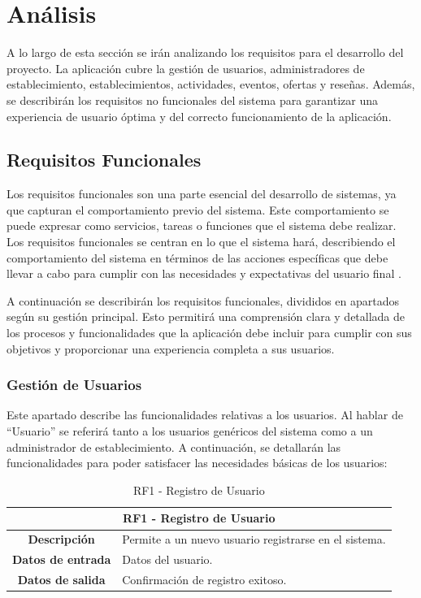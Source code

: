 \chapter{Análisis}

A lo largo de esta sección se irán analizando los requisitos para el desarrollo del proyecto. La aplicación cubre la gestión de usuarios, administradores de establecimiento, establecimientos, actividades, eventos, ofertas y reseñas. Además, se describirán los requisitos no funcionales del sistema para garantizar una experiencia de usuario óptima y del correcto funcionamiento de la aplicación.

\section{Requisitos Funcionales}

Los requisitos funcionales son una parte esencial del desarrollo de sistemas, ya que capturan el comportamiento previo del sistema. Este comportamiento se puede expresar como servicios, tareas o funciones que el sistema debe realizar. Los requisitos funcionales se centran en lo que el sistema hará, describiendo el comportamiento del sistema en
términos de las acciones específicas que debe llevar a  cabo para cumplir con las necesidades y expectativas del usuario final \cite{malan_bredemeyer} \cite{shah} \cite{sagar}.

A continuación se describirán los requisitos funcionales, divididos en apartados según su gestión principal. Esto permitirá una comprensión clara y detallada de los procesos y funcionalidades que la aplicación debe incluir para cumplir con sus objetivos y proporcionar una experiencia completa a sus usuarios.


\subsection{Gestión de Usuarios}

Este apartado describe las funcionalidades relativas a los usuarios. Al hablar de “Usuario” se referirá tanto a los usuarios genéricos del sistema como a un administrador de establecimiento. A continuación, se detallarán las funcionalidades para poder satisfacer las necesidades básicas de los usuarios:

\begin{table}[H]
    \centering
    \begin{tabular}{|c|p{10cm}|}
        \hline
        \multicolumn{2}{|c|}{\textbf{RF1 - Registro de Usuario}}                          \\
        \hline
        \textbf{Descripción}      & Permite a un nuevo usuario registrarse en el sistema. \\
        \hline
        \textbf{Datos de entrada} & Datos del usuario.                                    \\
        \hline
        \textbf{Datos de salida}  & Confirmación de registro exitoso.                     \\
        \hline
    \end{tabular}
    \caption{RF1 - Registro de Usuario}
\end{table}

